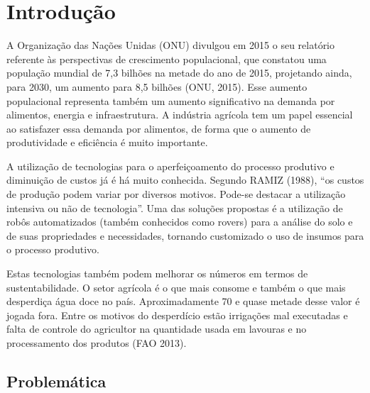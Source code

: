 \chapter{Introdução}

  A Organização das Nações Unidas (ONU) divulgou em 2015 o seu relatório referente
  às perspectivas de crescimento populacional, que constatou uma população mundial
  de 7,3 bilhões na metade do ano de 2015, projetando ainda, para 2030, um aumento
  para 8,5 bilhões (ONU, 2015). Esse aumento populacional representa também um
  aumento significativo na demanda por alimentos, energia e infraestrutura.
  A indústria agrícola tem um papel essencial ao satisfazer essa demanda por alimentos,
  de forma que o aumento de produtividade e eficiência é muito importante.
 
  A utilização de tecnologias para o aperfeiçoamento do processo produtivo e
  diminuição de custos já é há muito conhecida. Segundo RAMIZ (1988),
  “os custos de produção podem variar por diversos motivos. Pode-se destacar a
  utilização intensiva ou não de tecnologia”. Uma das soluções propostas é a
  utilização de robôs automatizados (também conhecidos como rovers) para a
  análise do solo e de suas propriedades e necessidades, tornando customizado
  o uso de insumos para o processo produtivo.

  Estas tecnologias também podem melhorar os números em termos de sustentabilidade.
  O setor agrícola é o que mais consome e também o que mais desperdiça água doce no país.
  Aproximadamente 70%
  e quase metade desse valor é jogada fora. Entre os motivos do desperdício estão
  irrigações mal executadas e falta de controle do agricultor na quantidade usada
  em lavouras e no processamento dos produtos (FAO 2013).
    
  \section{Problemática}
  
